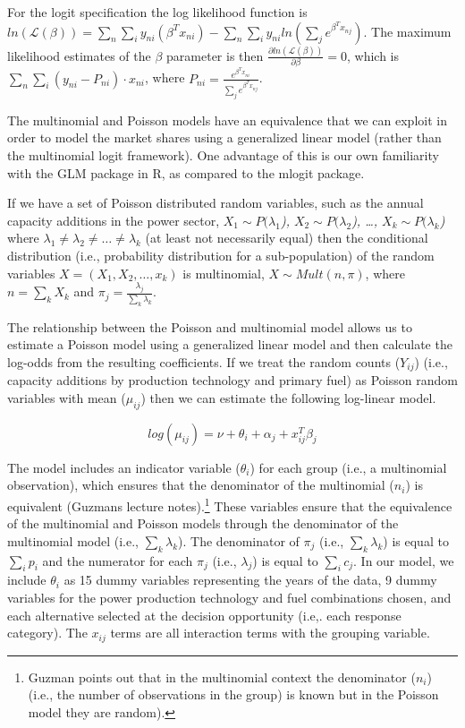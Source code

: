 \documentclass[10pt]{amsart}
\begin{document}
For the logit specification the log likelihood function is $ln(\mathcal{L(\beta)})= \sum_{n} \sum_{i} y_{ni}\left(\beta^{T} x_{ni}\right) - \sum_{n} \sum_{i} y_{ni} ln\left(\sum_{j}e^{\beta^{T}x_{nj}}\right)$.
The maximum likelihood estimates of the $\beta$ parameter is then $\frac{\partial ln\left(\mathcal{L(\beta)}\right)}{\partial \beta} = 0$, which is $\sum_{n}\sum_{i} \left(y_{ni} - P_{ni}\right)\cdot x_{ni}$, where $P_{ni} = \frac{e^{\beta^{T}x_{ni}}}{\sum_{j} e^{\beta^{T}x_{nj}}}$.

The multinomial and Poisson models have an equivalence that we can exploit in order to model the market shares using a generalized linear model (rather than the multinomial logit framework).
One advantage of this is our own familiarity with the GLM package in R, as compared to the mlogit package. 

If we have a set of Poisson distributed random variables, such as the annual capacity additions in the power sector, \textit{$X_1 \sim P(\lambda_1$), $X_2 \sim P(\lambda_2$), \ldots, $X_k \sim P(\lambda_k$)} where $\lambda_1 \neq \lambda_2 \neq \ldots \neq \lambda_k$ (at least not necessarily equal) then the conditional distribution (i.e., probability distribution for a sub-population) of the random variables \textit{$X = (X_1, X_2, \ldots, x_k)$} is multinomial, $X \sim Mult(n, \pi)$, where \textit{$n = \sum_k X_k$} and \textit{$\pi_j = \frac{\lambda_j}{\sum_k \lambda_k}$}. 

The relationship between the Poisson and multinomial model allows us to estimate a Poisson model using a generalized linear model and then calculate the log-odds from the resulting coefficients. 
If we treat the random counts ($Y_{ij}$) (i.e., capacity additions by production technology and primary fuel) as Poisson random variables with mean ($\mu_{ij}$) then we can estimate the following log-linear model. 

\begin{equation}\label{equation_poisson}
log(\mu_{ij}) = \nu + \theta_i + \alpha_j + x_{ij}^T\beta_j 
\end{equation}

The model includes an indicator variable ($\theta_i$) for each group (i.e., a multinomial observation), which ensures that the denominator of the multinomial ($n_i$) is equivalent \parencite{} (Guzmans lecture notes).\footnote{Guzman points out that in the multinomial context the denominator ($n_i$) (i.e., the number of observations in the group) is known but in the Poisson model they are random).}
These variables ensure that the equivalence of the multinomial and Poisson models through the denominator of the multinomial model (i.e., $\sum_k \lambda_k$). 
The denominator of $\pi_j$ (i.e., $\sum_k \lambda_k$) is equal to $\sum_i p_i$ and the numerator for each $\pi_j$ (i.e., $\lambda_j$) is equal to $\sum_i c_j$.
In our model, we include $\theta_i$ as 15 dummy variables representing the years of the data, 9 dummy variables for the power production technology and fuel combinations chosen,   
 and each alternative selected at the decision opportunity (i.e,. each response category).
The $x_{ij}$ terms are all interaction terms with the grouping variable.
\end{document}
